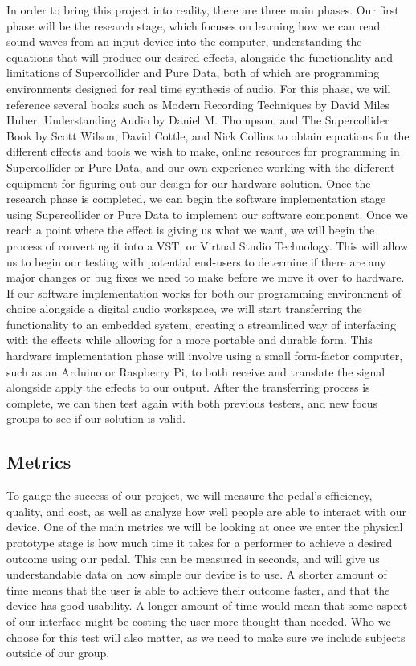 \documentclass[onecolumn, draftclsnofoot,10pt, compsoc]{IEEEtran}
\begin{document}
In order to bring this project into reality, there are three main phases. Our first phase will be the research stage, which focuses on learning how we can read sound waves from an input device into the computer, understanding the equations that will produce our desired effects, alongside the functionality and limitations of Supercollider and Pure Data, both of which are programming environments designed for real time synthesis of audio. For this phase, we will reference several books such as Modern Recording Techniques by David Miles Huber, Understanding Audio by Daniel M. Thompson, and The Supercollider Book by Scott Wilson, David Cottle, and Nick Collins to obtain equations for the different effects and tools we wish to make, online resources for programming in Supercollider or Pure Data, and our own experience working with the different equipment for figuring out our design for our hardware solution.
Once the research phase is completed, we can begin the software implementation stage using Supercollider or Pure Data to implement our software component. Once we reach a point where the effect is giving us what we want, we will begin the process of converting it into a VST, or Virtual Studio Technology. This will allow us to begin our testing with potential end-users to determine if there are any major changes or bug fixes we need to make before we move it over to hardware.
If our software implementation works for both our programming environment of choice alongside a digital audio workspace, we will start transferring the functionality to an embedded system, creating a streamlined way of interfacing with the effects while allowing for a more portable and durable form. This hardware implementation phase will involve using a small form-factor computer, such as an Arduino or Raspberry Pi, to both receive and translate the signal alongside apply the effects to our output. After the transferring process is complete, we can then test again with both previous testers, and new focus groups to see if our solution is valid.

\subsection{Metrics}
To gauge the success of our project, we will measure the pedal's efficiency, quality, and cost, as well as analyze how well people are able to interact with our device. One of the main metrics we will be looking at once we enter the physical prototype stage is how much time it takes for a performer to achieve a desired outcome using our pedal. This can be measured in seconds, and will give us understandable data on how simple our device is to use. A shorter amount of time means that the user is able to achieve their outcome faster, and that the device has good usability. A longer amount of time would mean that some aspect of our interface might be costing the user more thought than needed. Who we choose for this test will also matter, as we need to make sure we include subjects outside of our group.
\end{document}
